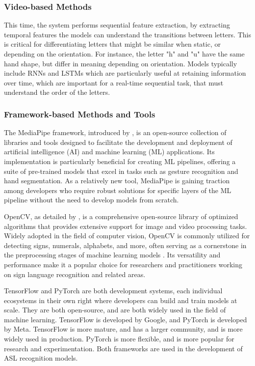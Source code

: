 \subsubsection{Video-based Methods}
This time, the system performs sequential feature extraction, by extracting temporal features the models can understand the transitions between letters. This is critical for differentiating letters that might be similar when static, or depending on the orientation. For instance, the letter "h" and "u" have the same hand shape, but differ in meaning depending on orientation. Models typically include RNNs and LSTMs which are  particularly useful at retaining information over time, which are important for a real-time sequential task, that must understand the order of the letters.

\subsubsection{Framework-based Methods and Tools}
The MediaPipe framework, introduced by \cite{lugaresiMediaPipeFrameworkBuilding2019}, is an open-source collection of libraries and tools designed to facilitate the development and deployment of artificial intelligence (AI) and machine learning (ML) applications. Its implementation is particularly beneficial for creating ML pipelines, offering a suite of pre-trained models that excel in tasks such as gesture recognition and hand segmentation. As a relatively new tool, MediaPipe is gaining traction among developers who require robust solutions for specific layers of the ML pipeline without the need to develop models from scratch.

OpenCV, as detailed by \cite{culjakBriefIntroductionOpenCV}, is a comprehensive open-source library of optimized algorithms that provides extensive support for image and video processing tasks. Widely adopted in the field of computer vision, OpenCV is commonly utilized for detecting signs, numerals, alphabets, and more, often serving as a cornerstone in the preprocessing stages of machine learning models \cite{srinivasanPythonOpencvSign2023}. Its versatility and performance make it a popular choice for researchers and practitioners working on sign language recognition and related areas.

TensorFlow \cite{abadiTensorFlowSystemLargescale2016} and PyTorch \cite{paszkePyTorchImperativeStyle2019} are both development systems, each individual ecosystems in their own right where developers can build and train models at scale. They are both open-source, and are both widely used in the field of machine learning. TensorFlow is developed by Google, and PyTorch is developed by Meta. TensorFlow is more mature, and has a larger community, and is more widely used in production. PyTorch is more flexible, and is more popular for research and experimentation. Both frameworks are used in the development of ASL recognition models.


